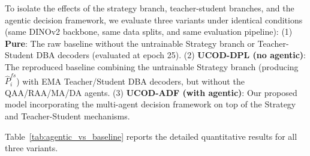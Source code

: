 \documentclass[journal,twoside,web]{IEEEtran}
\newcommand{\methodname}{UCOD-ADF}
\begin{document}
To isolate the effects of the strategy branch, teacher-student branches, and the agentic decision framework, we evaluate three variants under identical conditions (same DINOv2 backbone, same data splits, and same evaluation pipeline):
(1) \textbf{Pure}: The raw baseline without the untrainable Strategy branch or Teacher-Student DBA decoders (evaluated at epoch 25).
(2) \textbf{UCOD-DPL (no agentic)}: The reproduced baseline combining the untrainable Strategy branch (producing $\hat{P}_i^{fs}$) with EMA Teacher/Student DBA decoders, but without the QAA/RAA/MA/DA agents.
(3) \textbf{\methodname{} (with agentic)}: Our proposed model incorporating the multi-agent decision framework on top of the Strategy and Teacher-Student mechanisms.

Table~\ref{tab:agentic_vs_baseline} reports the detailed quantitative results for all three variants.
\end{document}
